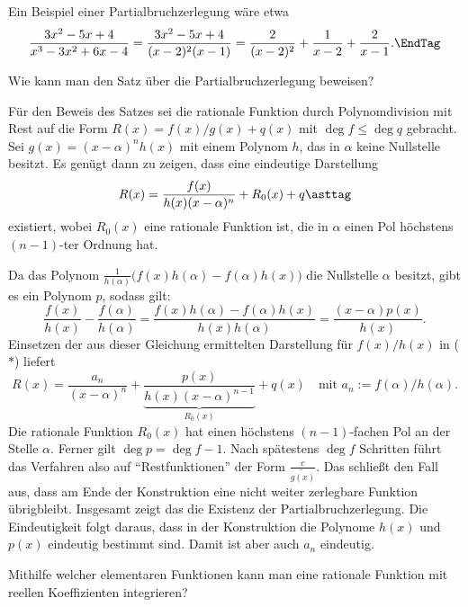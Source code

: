 \begin{antwort}
 Ein Beispiel einer Partialbruchzerlegung wäre etwa
\[
\frac{3x^2-5x+4}{x^3-3x^2+6x-4} = 
\frac{3x^2-5x+4}{(x-2)^2(x-1)} = 
\frac{2}{(x-2)^2} + \frac{1}{x-2} + \frac{2}{x-1}.\EndTag
\]
\end{antwort}

\smallskip
\begin{frage}
Wie kann man den Satz über die Partialbruchzerlegung beweisen?
\end{frage}

\begin{antwort}
Für den Beweis des Satzes sei die rationale Funktion durch 
Polynomdivision mit Rest auf die Form 
$R(x)=f(x)/g(x)+q(x)$ mit $\deg f \le \deg q$ gebracht. 
Sei $g(x)=(x-\alpha)^n h(x)$ mit einem Polynom $h$, das 
in $\alpha$ keine Nullstelle besitzt. 
Es genügt dann zu zeigen, dass eine eindeutige Darstellung
\begin{equation}
R(x)= \frac{f(x)}{h(x)(x-\alpha)^n} + R_0(x) + q 
\asttag
\end{equation}
existiert, wobei $R_0(x)$ eine rationale Funktion ist, 
die in $\alpha$ einen Pol höchstens $(n-1)$-ter Ordnung hat. 

Da das Polynom 
$\frac{1}{h(\alpha)}\big( f(x)h(\alpha)-f(\alpha)h(x) \big)$ 
die Nullstelle $\alpha$ besitzt, gibt es ein Polynom $p$, 
sodass gilt: 
\[   
\frac{f(x)}{h(x)} - \frac{f(\alpha)}{h(\alpha)} 
= \frac{f(x)h(\alpha)-f(\alpha)h(x)}{h(x)h(\alpha)} 
= 
\frac{(x-\alpha)p(x)}{h(x)}. 
\]  
Einsetzen der aus dieser Gleichung 
ermittelten Darstellung für $f(x)/h(x)$ in ($\ast$) liefert 
\[
R(x)= \frac{a_n}{ (x-\alpha)^n }+
\underbrace{\frac{p(x)}{h(x)(x-\alpha)^{n-1}}}_{R_0(x)} + q(x)
\quad\text{mit $a_n := f(\alpha)/h(\alpha)$.} 
\]
Die rationale Funktion $R_0(x)$ 
hat einen höchstens $(n-1)$-fachen Pol an der Stelle $\alpha$. 
Ferner gilt $\deg p = \deg f -1$. Nach spätestens $\deg f$ 
Schritten führt das Verfahren also auf "`Restfunktionen"' der 
Form $\frac{c}{\tilde{g(x)}}$. Das schließt den Fall aus, dass 
am Ende der Konstruktion eine nicht weiter zerlegbare Funktion 
übrigbleibt. Insgesamt zeigt das die Existenz der 
Partialbruchzerlegung. Die Eindeutigkeit folgt daraus, 
dass in der Konstruktion die Polynome $h(x)$ und $p(x)$ 
eindeutig bestimmt sind. Damit ist aber 
auch $a_n$ eindeutig. 
\AntEnd
\end{antwort}

\begin{frage}\label{06_elfk}
Mithilfe welcher elementaren Funktionen kann man eine rationale 
Funktion mit reellen Koeffizienten integrieren?
\end{frage}

